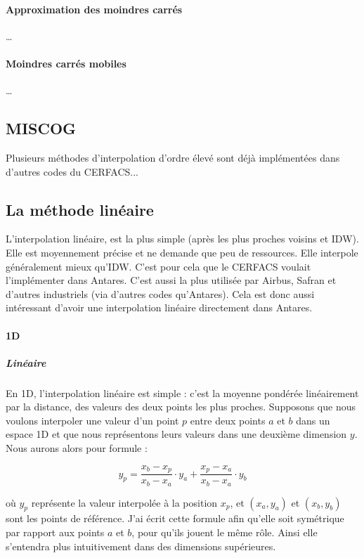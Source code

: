 \paragraph{Approximation des moindres carrés}
\vspace{0.5cm}
\dots
\paragraph{Moindres carrés mobiles}
\vspace{0.5cm}
\dots


\subsection{MISCOG}

Plusieurs méthodes d'interpolation d'ordre élevé sont déjà implémentées dans d'autres codes du CERFACS...

\subsection{La méthode linéaire}
L'interpolation linéaire, est la plus simple (après les plus proches voisins et IDW). Elle est moyennement précise et ne demande que peu de ressources. Elle interpole généralement mieux qu'IDW. C'est pour cela que le CERFACS voulait l'implémenter dans Antares. C'est aussi la plus utilisée par Airbus, Safran et d'autres industriels (via d'autres codes qu'Antares). Cela est donc aussi intéressant d'avoir une interpolation linéaire directement dans Antares.


\paragraph{1D}
\subparagraph{Linéaire}

En 1D, l'interpolation linéaire est simple : c'est la moyenne pondérée linéairement par la distance, des valeurs des deux points les plus proches.
Supposons que nous voulons interpoler une valeur d'un point \( p \) entre deux points \( a \) et \( b \) dans un espace 1D
et que nous représentons leurs valeurs dans une deuxième dimension \( y \).
Nous aurons alors pour formule :

\[
y_p = \frac{x_b - x_p}{x_b - x_a} \cdot y_a + \frac{x_p - x_a}{x_b - x_a} \cdot y_b
\]

où \( y_p \) représente la valeur interpolée à la position \( x_p \), et \((x_a, y_a)\) et \((x_b, y_b)\) sont les points de référence. J'ai écrit cette formule afin qu'elle soit symétrique par rapport aux points \( a \) et \( b \), pour qu'ils jouent le même rôle. Ainsi elle s'entendra plus intuitivement dans des dimensions supérieures.
\vspace{0.5cm}

